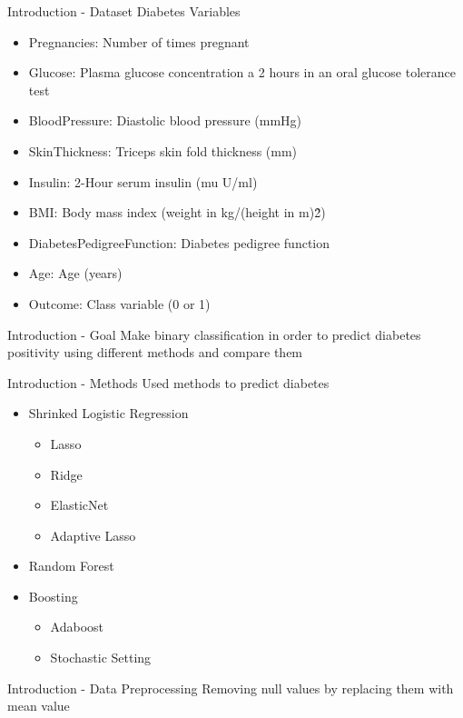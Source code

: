 \begin{frame}{Introduction - Dataset Diabetes}
    Variables
    \begin{itemize}
        \item Pregnancies: Number of times pregnant
        \item Glucose: Plasma glucose concentration a 2 hours in an oral glucose tolerance test
        \item BloodPressure: Diastolic blood pressure (mmHg)
        \item SkinThickness: Triceps skin fold thickness (mm)
        \item Insulin: 2-Hour serum insulin (mu U/ml)
        \item BMI: Body mass index (weight in kg/(height in m)\^2)
        \item DiabetesPedigreeFunction: Diabetes pedigree function
        \item Age: Age (years)
        \item Outcome: Class variable (0 or 1)
    \end{itemize}
\end{frame}

\begin{frame}{Introduction - Goal}
    Make binary classification in order to predict diabetes positivity using different methods and compare them     
\end{frame}

\begin{frame}{Introduction - Methods}
    Used methods to predict diabetes
    \begin{itemize}
        \item Shrinked Logistic Regression
        \begin{itemize}
            \item Lasso
            \item Ridge
            \item ElasticNet
            \item Adaptive Lasso
        \end{itemize}
        \item Random Forest
        \item Boosting
        \begin{itemize}
            \item Adaboost
            \item Stochastic Setting 
        \end{itemize}
    \end{itemize}
\end{frame}

\begin{frame}{Introduction - Data Preprocessing}
    Removing null values by replacing them with mean value
\end{frame}